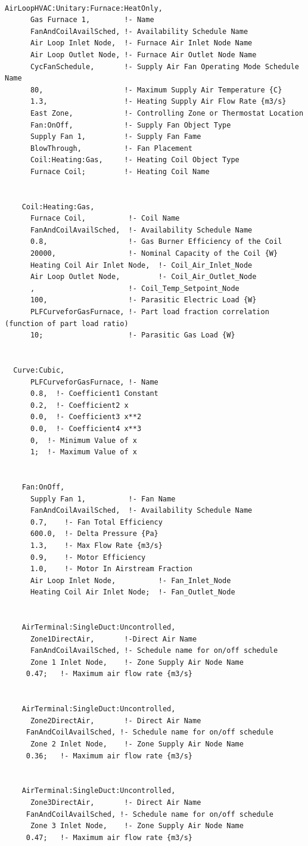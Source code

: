 \begin{lstlisting}

AirLoopHVAC:Unitary:Furnace:HeatOnly,
      Gas Furnace 1,        !- Name
      FanAndCoilAvailSched, !- Availability Schedule Name
      Air Loop Inlet Node,  !- Furnace Air Inlet Node Name
      Air Loop Outlet Node, !- Furnace Air Outlet Node Name
      CycFanSchedule,       !- Supply Air Fan Operating Mode Schedule Name
      80,                   !- Maximum Supply Air Temperature {C}
      1.3,                  !- Heating Supply Air Flow Rate {m3/s}
      East Zone,            !- Controlling Zone or Thermostat Location
      Fan:OnOff,            !- Supply Fan Object Type
      Supply Fan 1,         !- Supply Fan Fame
      BlowThrough,          !- Fan Placement
      Coil:Heating:Gas,     !- Heating Coil Object Type
      Furnace Coil;         !- Heating Coil Name


    Coil:Heating:Gas,
      Furnace Coil,          !- Coil Name
      FanAndCoilAvailSched,  !- Availability Schedule Name
      0.8,                   !- Gas Burner Efficiency of the Coil
      20000,                 !- Nominal Capacity of the Coil {W}
      Heating Coil Air Inlet Node,  !- Coil_Air_Inlet_Node
      Air Loop Outlet Node,         !- Coil_Air_Outlet_Node
      ,                      !- Coil_Temp_Setpoint_Node
      100,                   !- Parasitic Electric Load {W}
      PLFCurveforGasFurnace, !- Part load fraction correlation (function of part load ratio)
      10;                    !- Parasitic Gas Load {W}


  Curve:Cubic,
      PLFCurveforGasFurnace, !- Name
      0.8,  !- Coefficient1 Constant
      0.2,  !- Coefficient2 x
      0.0,  !- Coefficient3 x**2
      0.0,  !- Coefficient4 x**3
      0,  !- Minimum Value of x
      1;  !- Maximum Value of x


    Fan:OnOff,
      Supply Fan 1,          !- Fan Name
      FanAndCoilAvailSched,  !- Availability Schedule Name
      0.7,    !- Fan Total Efficiency
      600.0,  !- Delta Pressure {Pa}
      1.3,    !- Max Flow Rate {m3/s}
      0.9,    !- Motor Efficiency
      1.0,    !- Motor In Airstream Fraction
      Air Loop Inlet Node,          !- Fan_Inlet_Node
      Heating Coil Air Inlet Node;  !- Fan_Outlet_Node


    AirTerminal:SingleDuct:Uncontrolled,
      Zone1DirectAir,       !-Direct Air Name
      FanAndCoilAvailSched, !- Schedule name for on/off schedule
      Zone 1 Inlet Node,    !- Zone Supply Air Node Name
     0.47;   !- Maximum air flow rate {m3/s}


    AirTerminal:SingleDuct:Uncontrolled,
      Zone2DirectAir,       !- Direct Air Name
     FanAndCoilAvailSched, !- Schedule name for on/off schedule
      Zone 2 Inlet Node,    !- Zone Supply Air Node Name
     0.36;   !- Maximum air flow rate {m3/s}


    AirTerminal:SingleDuct:Uncontrolled,
      Zone3DirectAir,       !- Direct Air Name
     FanAndCoilAvailSched, !- Schedule name for on/off schedule
      Zone 3 Inlet Node,    !- Zone Supply Air Node Name
     0.47;   !- Maximum air flow rate {m3/s}
\end{lstlisting}

